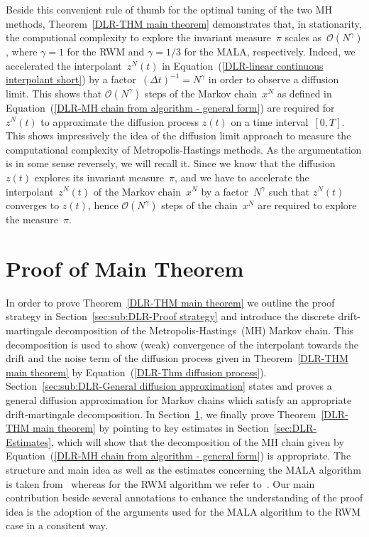 Beside this convenient rule of thumb for the optimal tuning of the two MH methods, Theorem~\ref{DLR-THM main theorem} demonstrates that, in stationarity, the computional complexity to explore the invariant measure~$\pi$ scales as~$\mathcal{O}(N^{\gamma})$, where $\gamma=1$ for the RWM and $\gamma=1/3$ for the MALA, respectively. Indeed, we accelerated the interpolant~$z^N(t)$ in Equation~(\ref{DLR-linear continuous interpolant short}) by a factor~$(\Delta t)^{-1} = N^{\gamma}$ in order to observe a diffusion limit. This shows that $\mathcal{O}(N^{\gamma})$ steps of the Markov chain~$x^N$ as defined in Equation~(\ref{DLR-MH chain from algorithm - general form}) are required for $z^N(t)$ to approximate the diffusion process $z(t)$ on a time interval~$[0,T]$. This shows impressively the idea of the diffusion limit approach to measure the computational complexity of Metropolis-Hastings methods. As the argumentation is in some sense reversely, we will recall it. Since we know that the diffusion~$z(t)$ explores its invariant measure~$\pi$, and we have to accelerate the interpolant~$z^N(t)$ of the Markov chain~$x^N$ by a factor~$N^{\gamma}$ such that $z^N(t)$ converges to $z(t)$, hence $\mathcal{O}(N^{\gamma})$ steps of the chain~$x^N$ are required to explore the measure~$\pi$.


\section{Proof of Main Theorem}
\label{sec:DLR-Proof}

In order to prove Theorem~\ref{DLR-THM main theorem} we outline the proof strategy in Section~\ref{sec:sub:DLR-Proof strategy} and introduce the discrete drift-martingale decomposition of the Metropolis-Hastings~(MH) Markov chain. This decomposition is used to show (weak) convergence of the interpolant towards the drift and the noise term of the diffusion process given in Theorem~\ref{DLR-THM main theorem} by Equation~(\ref{DLR-Thm diffusion process}). Section~\ref{sec:sub:DLR-General diffusion approximation} states and proves a general diffusion approximation for Markov chains which satisfy an appropriate drift-martingale decomposition. In Section~\ref{sec:DLR-Proof}, we finally prove Theorem~\ref{DLR-THM main theorem} by pointing to key estimates in Section~\ref{sec:DLR-Estimates}, which will show that the decomposition of the MH chain given by Equation~(\ref{DLR-MH chain from algorithm - general form}) is appropriate. The structure and main idea as well as the estimates concerning the MALA algorithm is taken from~\autocite{Pillai2012} whereas for the RWM algorithm we refer to~\autocite{Mattingly2010}. Our main contribution beside several annotations to enhance the understanding of the proof idea is the adoption of the arguments used for the MALA algorithm to the RWM case in a consitent way.


